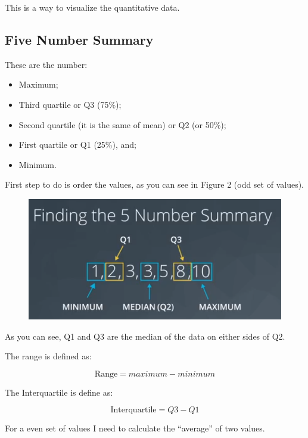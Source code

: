 \documentclass[]{book}
\providecommand{\tightlist}{%
  \setlength{\itemsep}{0pt}\setlength{\parskip}{0pt}}
\begin{document}
This is a way to visualize the quantitative data.

\subsection{Five Number Summary}\label{five-number-summary}

These are the number:

\begin{itemize}
\tightlist
\item
  Maximum;
\item
  Third quartile or Q3 (75\%);
\item
  Second quartile (it is the same of mean) or Q2 (or 50\%);
\item
  First quartile or Q1 (25\%), and;
\item
  Minimum.
\end{itemize}

First step to do is order the values, as you can see in Figure 2 (odd
set of values).

\begin{figure}
\centering
\includegraphics{01-img/c4_l2_02.png}
\caption{}
\end{figure}

As you can see, Q1 and Q3 are the median of the data on either sides of
Q2.

The range is defined as:

\[ \text{Range} = maximum - minimum \tag{1}\]

The Interquartile is define as:

\[ \text{Interquartile} = Q3 - Q1 \tag{2}\]

For a even set of values I need to calculate the ``average'' of two
values.
\end{document}
